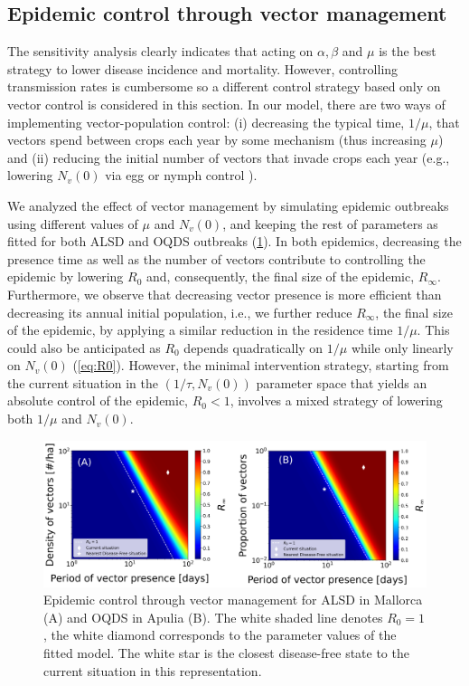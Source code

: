 \subsection{Epidemic control through vector management}

The sensitivity analysis clearly indicates that acting on $\alpha,\beta$
and $\mu$ is the best strategy to lower disease incidence and mortality.
However, controlling transmission rates is cumbersome so a different control
strategy based only on vector control is considered in this section. In our
model, there are two ways of implementing vector-population control: (i)
decreasing the typical time, $1/\mu$, that vectors spend between crops each
year by some mechanism (thus increasing $\mu$) and (ii) reducing the initial
number of vectors that invade crops each year (e.g., lowering $N_v(0)$ via egg
or nymph control \cite{Lago2023}).

We analyzed the effect of vector management by simulating epidemic
outbreaks using different values of $\mu$ and $N_v(0)$, and keeping the rest of
parameters as fitted for both ALSD and OQDS outbreaks
(\cref{fig:control_strategy}). In both epidemics, decreasing the presence time
as well as the number of vectors contribute to controlling the epidemic by
lowering $R_0$ and, consequently, the final size of the epidemic, $R_{\infty}$.
Furthermore, we observe that decreasing vector presence is more efficient than
decreasing its annual initial population, i.e., we further reduce $R_{\infty}$,
the final size of the epidemic, by applying a similar reduction in the
residence time $1/\mu$. This could also be anticipated as $R_0$ depends
quadratically on $1/\mu$ while only linearly on $N_v(0)$ (\cref{eq:R0}).
However, the minimal intervention strategy, starting from the current situation
in the $(1/\tau,N_v(0))$ parameter space that yields an absolute control of the
epidemic, $R_0<1$, involves a mixed strategy of lowering both $1/\mu$ and
$N_v(0)$.

\begin{figure}[H]
    \centering
    \includegraphics[width=\textwidth]{Figures/Control_strategy.png}
    \caption[Epidemic control through vector management for ALSD in Mallorca
        and
        OQDS in Apulia]{Epidemic control through vector management for ALSD in
        Mallorca (A) and OQDS in Apulia (B). The white shaded line denotes
        $R_0=1$, the
        white diamond corresponds to the parameter values of the fitted model.
        The
        white star is the closest disease-free state to the current situation
        in this
        representation.}
    \label{fig:control_strategy}
\end{figure}

